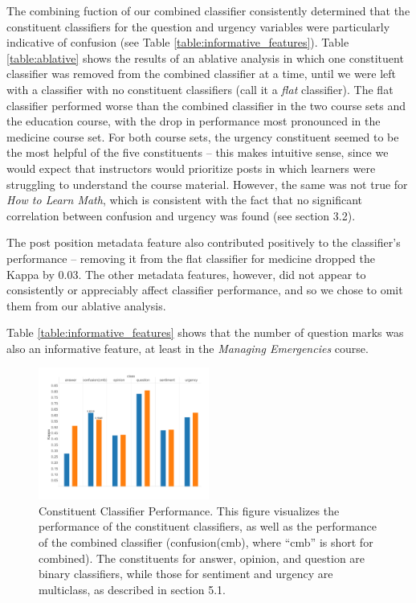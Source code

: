 \documentclass{edm_template}
\begin{document}
The combining fuction of our combined classifier consistently determined that the constituent classifiers for the question and urgency variables were particularly indicative of confusion (see Table \ref{table:informative_features}). Table \ref{table:ablative} shows the results of an ablative analysis in which one constituent classifier was removed from the combined classifier at a time, until we were left with a classifier with no constituent classifiers (call it a \emph{flat} classifier). The flat classifier performed worse than the combined classifier in the two course sets and the education course, with the drop in performance most pronounced in the medicine course set. For both course sets, the urgency constituent seemed to be the most helpful of the five constituents -- this makes intuitive sense, since we would expect that instructors would prioritize posts in which learners were struggling to understand the course material. However, the same was not true for \emph{How to Learn Math}, which is consistent with the fact that no significant correlation between confusion and urgency was found (see section 3.2).

The post position metadata feature also contributed positively to the classifier's performance -- removing it from the flat classifier for medicine dropped the Kappa by 0.03. The other metadata features, however, did not appear to consistently or appreciably affect classifier performance, and so we chose to omit them from our ablative analysis.

Table \ref{table:informative_features} shows that the number of question marks was also an informative feature, at least in the \emph{Managing Emergencies} course. 



\begin{figure}
\vspace{-20pt}
       \centering
       \includegraphics[width=0.5\textwidth]{../classifierEval.pdf}
       \vspace{-30pt}
       \caption{\textnormal{Constituent Classifier Performance. This figure visualizes the performance of the constituent classifiers, as well as the performance of the combined classifier (confusion(cmb), where ``cmb'' is short for combined). The constituents for answer, opinion, and question are binary classifiers, while those for sentiment and urgency are multiclass, as described in section 5.1.}}
      \label{figure:constituents}
\end{figure}
\end{document}
